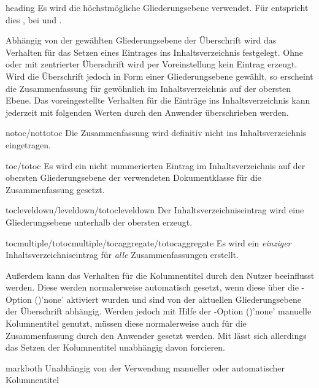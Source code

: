 \begin{Declaration*}{}
\begin{Declaration*}{}
\begin{Declaration*}{}
\begin{Declaration}[%
  v2.02!\Option{abstract=multiple}:ersetzt \Option{abstract=double};%
  v2.02!\Option{abstract=tocleveldown};%
  v2.02!\Option{abstract=markboth};%
  v2.04!\Option{abstract=tocmultiple}%
]{}
\begin{values}{}
\item[heading]
  Es wird die höchstmögliche Gliederungsebene verwendet. Für 
   entspricht dies , bei 
   und  .
\end{values}
%
Abhängig von der gewählten Gliederungsebene der Überschrift wird das Verhalten 
für das Setzen eines Eintrages ins Inhaltsverzeichnis festgelegt. Ohne oder mit 
zentrierter Überschrift wird per Voreinstellung kein Eintrag erzeugt. Wird die 
Überschrift jedoch in Form einer Gliederungsebene gewählt, so erscheint die 
Zusammenfassung für gewöhnlich im Inhaltsverzeichnis auf der obersten Ebene. 
Das voreingestellte Verhalten für die Einträge ins Inhaltsverzeichnis kann 
jederzeit mit folgenden Werten durch den Anwender überschrieben werden.
%
\begin{values}{}
\item[notoc/nottotoc]
  Die Zusammenfassung wird definitiv nicht ins Inhaltsverzeichnis eingetragen.
\item[toc/totoc]
  Es wird ein nicht nummerierten Eintrag im Inhaltsverzeichnis auf der obersten 
  Gliederungsebene der verwendeten Dokumentklasse für die Zusammenfassung 
  gesetzt.
\item[tocleveldown/leveldown/totocleveldown]
  Der Inhaltsverzeichniseintrag wird eine Gliederungsebene unterhalb der 
  obersten erzeugt.
\item[tocmultiple/totocmultiple/tocaggregate/totocaggregate]
  Es wird ein \emph{einziger} Inhaltsverzeichniseintrag für \emph{alle} 
  Zusammenfassungen erstellt.
\end{values}
%
Außerdem kann das Verhalten für die Kolumnentitel durch den Nutzer beeinflusst 
werden. Diese werden normalerweise automatisch gesetzt, wenn diese über die 
\KOMAScript-Option ()'none' 
aktiviert wurden und sind von der aktuellen Gliederungsebene der Überschrift 
abhängig. Werden jedoch mit Hilfe der \KOMAScript-Option 
()'none' manuelle Kolumnentitel 
genutzt, müssen diese normalerweise auch für die Zusammenfassung durch den 
Anwender gesetzt werden. Mit  lässt sich allerdings 
das Setzen der Kolumnentitel unabhängig davon forcieren.
%
\begin{values}{}
\item[markboth]
  Unabhängig von der Verwendung manueller oder automatischer Kolumnentitel 

\end{values}
\end{Declaration}
\end{Declaration*}
\end{Declaration*}
\end{Declaration*}
